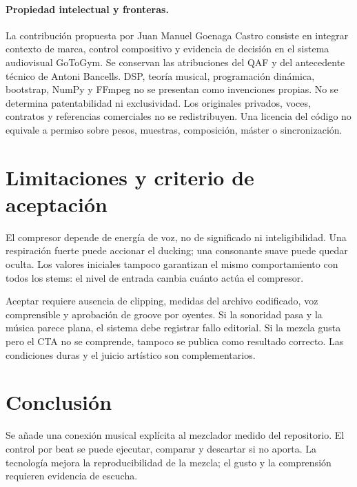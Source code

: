 \documentclass[11pt,a4paper]{article}
\begin{document}
\newpage
\paragraph{Propiedad intelectual y fronteras.}
La contribución propuesta por Juan Manuel Goenaga Castro consiste en integrar contexto de marca, control compositivo y evidencia de decisión en el sistema audiovisual GoToGym. Se conservan las atribuciones del QAF y del antecedente técnico de Antoni Bancells. DSP, teoría musical, programación dinámica, bootstrap, NumPy y FFmpeg no se presentan como invenciones propias. No se determina patentabilidad ni exclusividad. Los originales privados, voces, contratos y referencias comerciales no se redistribuyen. Una licencia del código no equivale a permiso sobre pesos, muestras, composición, máster o sincronización.
\section{Limitaciones y criterio de aceptación}
El compresor depende de energía de voz, no de significado ni inteligibilidad. Una respiración fuerte puede accionar el ducking; una consonante suave puede quedar oculta. Los valores iniciales tampoco garantizan el mismo comportamiento con todos los stems: el nivel de entrada cambia cuánto actúa el compresor.

Aceptar requiere ausencia de clipping, medidas del archivo codificado, voz comprensible y aprobación de groove por oyentes. Si la sonoridad pasa y la música parece plana, el sistema debe registrar fallo editorial. Si la mezcla gusta pero el CTA no se comprende, tampoco se publica como resultado correcto. Las condiciones duras y el juicio artístico son complementarios.
\section{Conclusión}
Se añade una conexión musical explícita al mezclador medido del repositorio. El control por beat se puede ejecutar, comparar y descartar si no aporta. La tecnología mejora la reproducibilidad de la mezcla; el gusto y la comprensión requieren evidencia de escucha.
\end{document}
